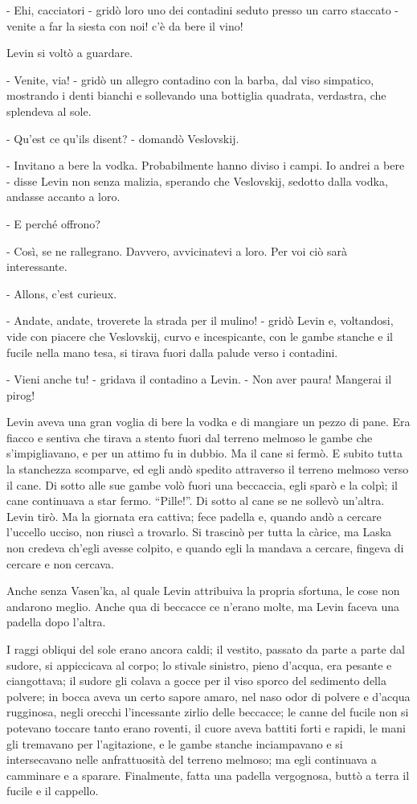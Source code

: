 - Ehi, cacciatori - gridò loro uno dei contadini seduto presso un carro staccato - venite a far la siesta con noi! c'è da bere il vino! 

Levin si voltò a guardare. 

- Venite, via! - gridò un allegro contadino con la barba, dal viso simpatico, mostrando i denti bianchi e sollevando una bottiglia quadrata, verdastra, che splendeva al sole. 

- Qu'est ce qu'ils disent? - domandò Veslovskij. 

- Invitano a bere la vodka. Probabilmente hanno diviso i campi. Io andrei a bere - disse Levin non senza malizia, sperando che Veslovskij, sedotto dalla vodka, andasse accanto a loro. 

- E perché offrono? 

- Così, se ne rallegrano. Davvero, avvicinatevi a loro. Per voi ciò sarà interessante. 

- Allons, c'est curieux. 

- Andate, andate, troverete la strada per il mulino! - gridò Levin e, voltandosi, vide con piacere che Veslovskij, curvo e incespicante, con le gambe stanche e il fucile nella mano tesa, si tirava fuori dalla palude verso i contadini. 

- Vieni anche tu! - gridava il contadino a Levin. - Non aver paura! Mangerai il pirog! 

Levin aveva una gran voglia di bere la vodka e di mangiare un pezzo di pane. Era fiacco e sentiva che tirava a stento fuori dal terreno melmoso le gambe che s'impigliavano, e per un attimo fu in dubbio. Ma il cane si fermò. E subito tutta la stanchezza scomparve, ed egli andò spedito attraverso il terreno melmoso verso il cane. Di sotto alle sue gambe volò fuori una beccaccia, egli sparò e la colpì; il cane continuava a star fermo. ``Pille!''. Di sotto al cane se ne sollevò un'altra. Levin tirò. Ma la giornata era cattiva; fece padella e, quando andò a cercare l'uccello ucciso, non riuscì a trovarlo. Si trascinò per tutta la càrice, ma Laska non credeva ch'egli avesse colpito, e quando egli la mandava a cercare, fingeva di cercare e non cercava. 

Anche senza Vasen'ka, al quale Levin attribuiva la propria sfortuna, le cose non andarono meglio. Anche qua di beccacce ce n'erano molte, ma Levin faceva una padella dopo l'altra. 

I raggi obliqui del sole erano ancora caldi; il vestito, passato da parte a parte dal sudore, si appiccicava al corpo; lo stivale sinistro, pieno d'acqua, era pesante e ciangottava; il sudore gli colava a gocce per il viso sporco del sedimento della polvere; in bocca aveva un certo sapore amaro, nel naso odor di polvere e d'acqua rugginosa, negli orecchi l'incessante zirlio delle beccacce; le canne del fucile non si potevano toccare tanto erano roventi, il cuore aveva battiti forti e rapidi, le mani gli tremavano per l'agitazione, e le gambe stanche inciampavano e si intersecavano nelle anfrattuosità del terreno melmoso; ma egli continuava a camminare e a sparare. Finalmente, fatta una padella vergognosa, buttò a terra il fucile e il cappello. 

